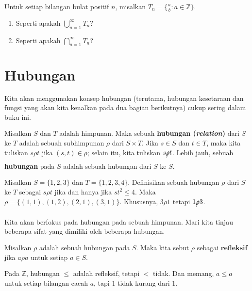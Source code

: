 \begin{exc}
Untuk setiap bilangan bulat positif $n$, misalkan $T_n = \{\frac{a}{b} : a \in \mathbb{Z}\}$.
\begin{enumerate}
    \item Seperti apakah $\bigcup_{n=1}^\infty T_n$?
    \item Seperti apakah $\bigcap_{n=1}^\infty T_n$?
\end{enumerate}
\end{exc}


\section{Hubungan}

Kita akan menggunakan konsep hubungan (terutama, hubungan kesetaraan dan fungsi yang akan kita kenalkan pada dua bagian berikutnya) cukup sering dalam buku ini.

\begin{defn}
Misalkan $S$ dan $T$ adalah himpunan. Maka sebuah \textbf{hubungan (\textit{relation})} dari $S$ ke $T$ adalah sebuah subhimpunan $\rho$ dari $S \times T$. Jika $s \in S$ dan $t \in T$, maka kita tuliskan $s\rho t$ jika $(s, t) \in \rho$; selain itu, kita tuliskan $s \xout{\rho} t$. Lebih jauh, sebuah \textbf{hubungan} pada $S$ adalah sebuah hubungan dari $S$ ke $S$. 
\end{defn}

\begin{exmp}
Misalkan $S = \{1, 2, 3\}$ dan $T = \{1, 2, 3, 4\}$. Definisikan sebuah hubungan $\rho$ dari $S$ ke $T$ sebagai $s \rho t$ jika dan hanya jika $s t^2 \leq 4$. Maka $\rho = \{(1,1), (1,2), (2,1), (3,1)\}$. Khususnya, $3 \rho 1$ tetapi $1 \xout{\rho} 3$.
\end{exmp}

Kita akan berfokus pada hubungan pada sebuah himpunan. Mari kita tinjau beberapa sifat yang dimiliki oleh beberapa hubungan.

\begin{defn}
Misalkan $\rho$ adalah sebuah hubungan pada $S$. Maka kita sebut $\rho$ sebagai \textbf{refleksif} jika $a \rho a$ untuk setiap $a \in S$.
\end{defn}

\begin{exmp}
Pada $\mathbb{Z}$, hubungan $\leq$ adalah refleksif, tetapi $<$ tidak. Dan memang, $a \leq a$ untuk setiap bilangan cacah $a$, tapi $1$ tidak kurang dari $1$.
\end{exmp}

